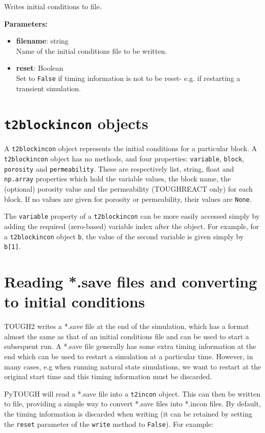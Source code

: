 Writes initial conditions to file.

\textbf{Parameters:}
\begin{itemize}
\item \textbf{filename}: string\\
  Name of the initial conditions file to be written.
\item \textbf{reset}: Boolean\\
  Set to \texttt{False} if timing information is not to be reset- e.g. if restarting a transient simulation.
\end{itemize}

\section{\texttt{t2blockincon} objects}
\label{t2blockincons}

A \texttt{t2blockincon} object represents the initial conditions for a particular block.  A \texttt{t2blockincon} object has no methods, and four properties: \texttt{variable}, \texttt{block}, \texttt{porosity} and \texttt{permeability}.  These are respectively list, string, float and \texttt{np.array} properties which hold the variable values, the block name, the (optional) porosity value and the permeability (TOUGHREACT only) for each block.  If no values are given for porosity or permeability, their values are \texttt{None}.

The \texttt{variable} property of a \texttt{t2blockincon} can be more easily accessed simply by adding the required (zero-based) variable index after the object.  For example, for a \texttt{t2blockincon} object \texttt{b}, the value of the second variable is given simply by \texttt{b[1]}.

\section{Reading *.save files and converting to initial conditions}

TOUGH2 writes a *.save file at the end of the simulation, which has a format almost the same as that of an initial conditions file and can be used to start a subsequent run.  A *.save file generally has some extra timing information at the end which can be used to restart a simulation at a particular time.  However, in many cases, e.g when running natural state simulations, we want to restart at the original start time and this timing information must be discarded.

PyTOUGH will read a *.save file into a \texttt{t2incon} object.  This can then be written to file, providing a simple way to convert *.save files into *.incon files.  By default, the timing information is discarded when writing (it can be retained by setting the \texttt{reset} parameter of the \texttt{write} method to \texttt{False}).  For example:


